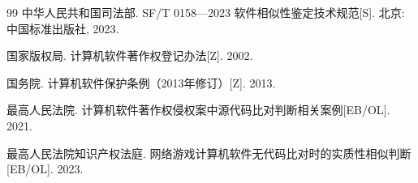 \documentclass[UTF8,a4paper,zihao=5]{ctexart}
\begin{document}
\begin{thebibliography}{99}
 中华人民共和国司法部. SF/T 0158—2023 软件相似性鉴定技术规范[S]. 北京: 中国标准出版社, 2023.

 国家版权局. 计算机软件著作权登记办法[Z]. 2002.

 国务院. 计算机软件保护条例（2013年修订）[Z]. 2013.

 最高人民法院. 计算机软件著作权侵权案中源代码比对判断相关案例[EB/OL]. 2021.

 最高人民法院知识产权法庭. 网络游戏计算机软件无代码比对时的实质性相似判断[EB/OL]. 2023.

\end{thebibliography}
\endgroup
\end{document}
